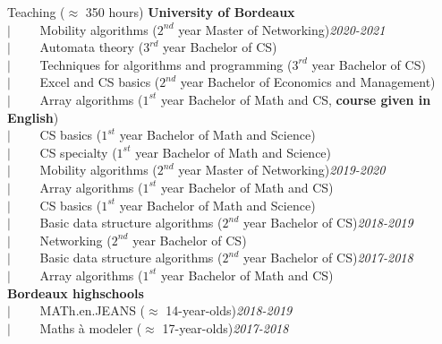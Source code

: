 \documentclass[french]{resume} %
\begin{document}
\begin{rSection}{Teaching ($\approx$ 350 hours)}
\textbf{University of Bordeaux} \\
$| \qquad$ Mobility algorithms ($2^{nd}$ year Master of Networking)\hfill {\em 2020-2021}\\
$| \qquad$ Automata theory ($3^{rd}$ year Bachelor of CS)\\
$| \qquad$ Techniques for algorithms and programming ($3^{rd}$ year Bachelor of CS)\\
$| \qquad$ Excel and CS basics ($2^{nd}$ year Bachelor of Economics and Management)\\
$| \qquad$ Array algorithms ($1^{st}$ year Bachelor of Math and CS, \textbf{course given in English})\\
$| \qquad$ CS basics ($1^{st}$ year Bachelor of Math and Science)\\
$| \qquad$ CS specialty ($1^{st}$ year Bachelor of Math and Science)\\
$| \qquad$ Mobility algorithms ($2^{nd}$ year Master of Networking)\hfill {\em 2019-2020}\\
$| \qquad$ Array algorithms ($1^{st}$ year Bachelor of Math and CS)\\
$| \qquad$ CS basics ($1^{st}$ year Bachelor of Math and Science)\\
$| \qquad$ Basic data structure algorithms ($2^{nd}$ year Bachelor of CS)\hfill {\em 2018-2019}\\
$| \qquad$ Networking ($2^{nd}$ year Bachelor of CS)\\
$| \qquad$ Basic data structure algorithms ($2^{nd}$ year Bachelor of CS)\hfill {\em 2017-2018}\\
$| \qquad$ Array algorithms ($1^{st}$ year Bachelor of Math and CS)
\\

\textbf{Bordeaux highschools} \\
$| \qquad$ MATh.en.JEANS ($\approx$ 14-year-olds)\hfill {\em 2018-2019}\\
$| \qquad$ Maths à modeler ($\approx$ 17-year-olds)\hfill {\em 2017-2018}
\end{rSection}
\end{document}
